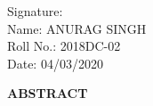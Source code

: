 \documentclass[12pt]{article}
\begin{document}
		\noindent Signature:\vspace{1cm}\\
		Name: ANURAG SINGH \\
		Roll No.: 2018DC-02  \\
		Date: 04/03/2020   \\
		\clearpage
		
		
		\topmargin=-1in    
		\textheight=24cm  
		\oddsidemargin=0pt %
		\textwidth=6.5in   %
		
		\begin{center}
			{\large \bf ABSTRACT}
		\end{center}  
		
\end{document}
